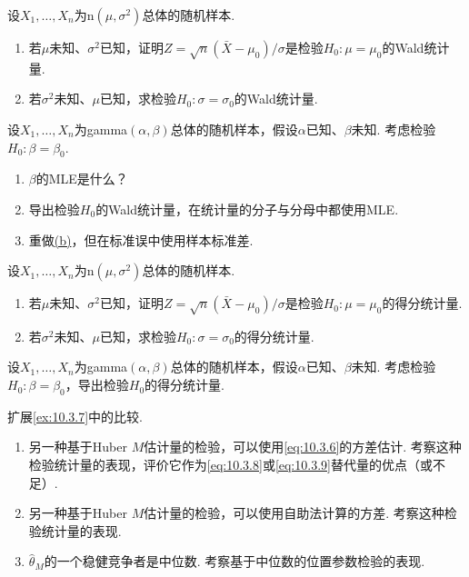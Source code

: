 \begin{exercise}\label{exercise:10.35}
设$X_1,\ldots,X_n$为$\mathrm n(\mu,\sigma^2)$总体的随机样本.
\begin{enumerate}[label=(\alph*)]
\item 若$\mu$未知、$\sigma^2$已知，证明$Z=\sqrt n(\bar X-\mu_0)/\sigma$是检验$H_0:\mu=\mu_0$的Wald统计量.
\item 若$\sigma^2$未知、$\mu$已知，求检验$H_0:\sigma=\sigma_0$的Wald统计量.
\end{enumerate}
\end{exercise}

\begin{exercise}\label{exercise:10.36}
设$X_1,\ldots,X_n$为gamma$(\alpha,\beta)$总体的随机样本，假设$\alpha$已知、$\beta$未知. 考虑检验$H_0:\beta=\beta_0$.
\begin{enumerate}[label=(\alph*)]
\item $\beta$的MLE是什么？
\item\label{item:10.36.b} 导出检验$H_0$的Wald统计量，在统计量的分子与分母中都使用MLE.
\item 重做\hyperref[item:10.36.b]{(b)}，但在标准误中使用样本标准差.
\end{enumerate}
\end{exercise}

\begin{exercise}\label{exercise:10.37}
设$X_1,\ldots,X_n$为$\mathrm n(\mu,\sigma^2)$总体的随机样本.
\begin{enumerate}[label=(\alph*)]
\item 若$\mu$未知、$\sigma^2$已知，证明$Z=\sqrt n(\bar X-\mu_0)/\sigma$是检验$H_0:\mu=\mu_0$的得分统计量.
\item 若$\sigma^2$未知、$\mu$已知，求检验$H_0:\sigma=\sigma_0$的得分统计量.
\end{enumerate}
\end{exercise}

\begin{exercise}\label{exercise:10.38}
设$X_1,\ldots,X_n$为gamma$(\alpha,\beta)$总体的随机样本，假设$\alpha$已知、$\beta$未知. 考虑检验$H_0:\beta=\beta_0$，导出检验$H_0$的得分统计量.
\end{exercise}

\begin{exercise}\label{exercise:10.39}
扩展\autoref{ex:10.3.7}中的比较.
\begin{enumerate}[label=(\alph*)]
\item 另一种基于Huber $M$估计量的检验，可以使用\eqref{eq:10.3.6}的方差估计. 考察这种检验统计量的表现，评价它作为\eqref{eq:10.3.8}或\eqref{eq:10.3.9}替代量的优点（或不足）.
\item 另一种基于Huber $M$估计量的检验，可以使用自助法计算的方差. 考察这种检验统计量的表现.
\item $\hat\theta_M$的一个稳健竞争者是中位数. 考察基于中位数的位置参数检验的表现.
\end{enumerate}
\end{exercise}

